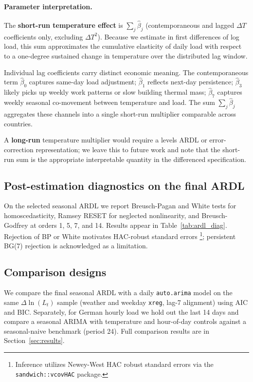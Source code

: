 \documentclass[12pt,a4paper]{article}
\begin{document}
\paragraph{Parameter interpretation.}
The \textbf{short-run temperature effect} is $\sum_j \hat{\beta}_j$ (contemporaneous and lagged $\Delta T$ coefficients only, excluding $\Delta T^2$). Because we estimate in first differences of log load, this sum approximates the cumulative elasticity of daily load with respect to a one-degree sustained change in temperature over the distributed lag window.

\noindent Individual lag coefficients carry distinct economic meaning. The contemporaneous term $\hat{\beta}_0$ captures same-day load adjustment; $\hat{\beta}_1$ reflects next-day persistence; $\hat{\beta}_3$ likely picks up weekly work patterns or slow building thermal mass; $\hat{\beta}_7$ captures weekly seasonal co-movement between temperature and load. The sum $\sum_j \hat{\beta}_j$ aggregates these channels into a single short-run multiplier comparable across countries.

\noindent A \textbf{long-run} temperature multiplier would require a levels ARDL or error-correction representation; we leave this to future work and note that the short-run sum is the appropriate interpretable quantity in the differenced specification.

\subsection{Post-estimation diagnostics on the final ARDL}
\label{sec:ardl-diagnostics}

On the selected seasonal ARDL we report Breusch-Pagan and White tests for homoscedasticity, Ramsey RESET for neglected nonlinearity, and Breusch-Godfrey at orders 1, 5, 7, and 14. Results appear in Table~\ref{tab:ardl_diag}. Rejection of BP or White motivates HAC-robust standard errors \footnote{Inference utilizes Newey-West HAC robust standard errors via the \texttt{sandwich::vcovHAC} package.}; persistent BG(7) rejection is acknowledged as a limitation.

\subsection{Comparison designs}

We compare the final seasonal ARDL with a daily \texttt{auto.arima} model on the same $\Delta\ln(L_t)$ sample (weather and weekday \texttt{xreg}, lag-7 alignment) using AIC and BIC. Separately, for German hourly load we hold out the last 14 days and compare a seasonal ARIMA with temperature and hour-of-day controls against a seasonal-naive benchmark (period 24). Full comparison results are in Section~\ref{sec:results}.
\end{document}
